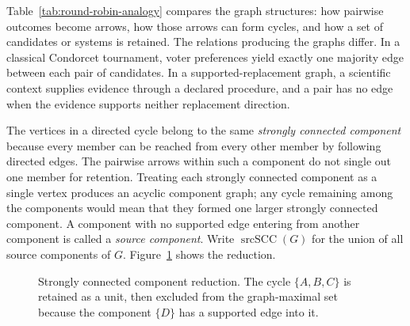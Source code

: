 \documentclass[11pt]{article}
\theoremstyle{remark}
\begin{document}
Table~\ref{tab:round-robin-analogy} compares the graph structures: how
pairwise outcomes become arrows, how those arrows can form cycles, and how a
set of candidates or systems is retained. The relations producing the graphs
differ. In a classical Condorcet tournament, voter preferences yield exactly
one majority edge between each pair of candidates. In a
supported-replacement graph, a scientific context supplies evidence through a
declared procedure, and a pair has no edge when the evidence supports neither
replacement direction.

The vertices in a directed cycle belong to the same \emph{strongly connected
component} because every member can be reached from every other member by
following directed edges. The pairwise arrows within such a component do not
single out one member for retention. Treating each strongly connected
component as a single vertex produces an acyclic component graph; any cycle
remaining among the components would mean that they formed one larger
strongly connected component. A component with no supported edge entering
from another component is called a \emph{source component}. Write
$\operatorname{srcSCC}(G)$ for the union of all source components of $G$.
Figure~\ref{fig:round-robin-scc} shows the reduction.

\begin{figure}[htbp]
\centering
{}
\caption{Strongly connected component reduction. The cycle
$\{A,B,C\}$ is retained as a unit, then excluded from the graph-maximal set
because the component $\{D\}$ has a supported edge into it.}
\label{fig:round-robin-scc}
\end{figure}
\end{document}
